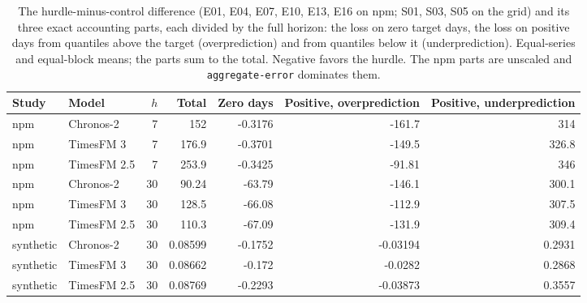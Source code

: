 \begin{table}[t]
\centering\small
\caption{The hurdle-minus-control difference (E01, E04, E07, E10, E13, E16 on npm; S01, S03, S05 on the
grid) and its three exact accounting parts, each divided by the full horizon: the loss on zero target days,
the loss on positive days from quantiles above the target (overprediction) and from quantiles below it
(underprediction). Equal-series and equal-block means; the parts sum to the total. Negative favors the
hurdle. The npm parts are unscaled and \texttt{aggregate-error} dominates them.}
\label{tab:s2parts}
\begin{tabular}{llrrrrr}
\toprule
Study & Model & $h$ & Total & Zero days & Positive, overprediction & Positive, underprediction \\
\midrule
npm & Chronos-2 & 7 & 152 & -0.3176 & -161.7 & 314 \\
npm & TimesFM 3 & 7 & 176.9 & -0.3701 & -149.5 & 326.8 \\
npm & TimesFM 2.5 & 7 & 253.9 & -0.3425 & -91.81 & 346 \\
npm & Chronos-2 & 30 & 90.24 & -63.79 & -146.1 & 300.1 \\
npm & TimesFM 3 & 30 & 128.5 & -66.08 & -112.9 & 307.5 \\
npm & TimesFM 2.5 & 30 & 110.3 & -67.09 & -131.9 & 309.4 \\
synthetic & Chronos-2 & 30 & 0.08599 & -0.1752 & -0.03194 & 0.2931 \\
synthetic & TimesFM 3 & 30 & 0.08662 & -0.172 & -0.0282 & 0.2868 \\
synthetic & TimesFM 2.5 & 30 & 0.08769 & -0.2293 & -0.03873 & 0.3557 \\
\bottomrule
\end{tabular}
\end{table}

